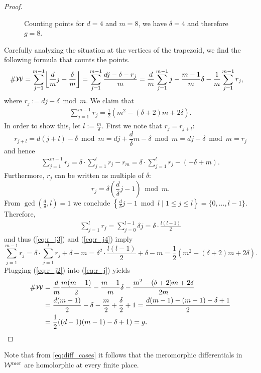 \documentclass[main.tex]{subfiles}
\begin{document}
\begin{proof}
\begin{figure}[H]
      \begin{center}
   
      \end{center}
    \caption{Counting points for $d =4$ and $m = 8$, we have $\delta = 4$ and therefore $g = 8$.}
    \label{fig:holom_diff}
\end{figure}
     Carefully analyzing the situation at the vertices of the trapezoid, we find the following formula that counts the points.
     \begin{align}\label{eq:r_j}
 \#\W & = \sum_{j = 1}^{m-1} \floor*{\frac{d}{m}j - \frac{\delta}{m}} = \sum_{j = 1}^{m-1} \frac{dj-\delta-r_j}{m} =
  \frac{d}{m} \sum_{j=1}^{m-1} j - \frac{m-1}{m}\delta - \frac{1}{m} \sum_{j=1}^{m-1} r_j,
     \end{align}
      where $r_j := dj - \delta  \bmod m$. \abstand
      We claim that
      \begin{align}\label{eq:r_j2}
       \sum_{j=1}^{m-1} r_j = \frac{1}{2}(m^2 - (\delta+2)m + 2\delta).
      \end{align}
      In order to show this, let $l := \frac{m}{\delta}$. First we note that $r_j = r_{j+l}$:
      $$r_{j+l} = d(j+l) - \delta  \bmod m = dj + \frac{d}{\delta}m - \delta  \bmod m =  dj - \delta  \bmod m =  r_j$$
      and hence
      \begin{align}\label{eq:r_j3}
       \sum_{j=1}^{m-1} r_j = \delta \cdot \sum_{j=1}^{l} r_j - r_m = \delta \cdot \sum_{j=1}^{l} r_j - (-\delta + m).
      \end{align}
      Furthermore, $r_j$ can be written as multiple of $\delta$:
      $$r_j = \delta \left(\frac{d}{\delta}j - 1\right)  \bmod m.$$
      From $\gcd(\frac{d}{\delta},l) = 1$ we conclude $\left\{  \frac{d}{\delta}j - 1  \bmod l  \mid  1 \le j \le l  \right\} = \{  0,\dots,l-1  \}$.
      Therefore,
      \begin{align}\label{eq:r_j4}
       \sum_{j = 1}^l r_j = \sum_{j = 0}^{l-1} \delta j = \delta \cdot \frac{l(l-1)}{2}
      \end{align}
      and thus (\ref{eq:r_j3}) and (\ref{eq:r_j4}) imply
      $$\sum_{j=1}^{m-1} r_j = \delta \cdot \sum_{j=1}^{l} r_j + \delta - m = \delta^2 \cdot \frac{l(l-1)}{2} + \delta - m = \frac{1}{2}(m^2 - (\delta+2)m + 2\delta).$$
      Plugging (\ref{eq:r_j2}) into (\ref{eq:r_j}) yields
      \begin{align*}
 \#\mathcal{W} & = \frac{d}{m}\frac{m(m-1)}{2} - \frac{m-1}{m}\delta - \frac{m^2 - (\delta+2)m + 2\delta}{2m} \\
        & = \frac{d(m-1)}{2} - \delta  - \frac{m}{2} + \frac{\delta}{2} + 1 =  \frac{d(m-1) - (m-1) - \delta + 1}{2} \\
        & = \frac{1}{2}((d-1)(m-1)-\delta+1) = g.
      \end{align*}
     \end{proof}

     \begin{rmk}
      Note that from \eqref{eq:diff_cases} it follows that the meromorphic differentials in $\mathcal{W}^{\text{mer}}$ are homolorphic at every finite place.
     \end{rmk}






\biblio
\end{document}
